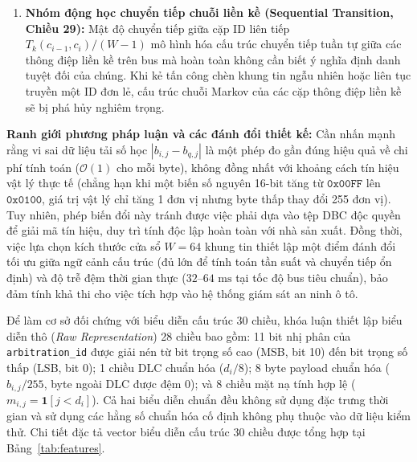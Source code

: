 \documentclass[12pt, a4paper, reqno, oneside]{book}
\DeclareRobustCommand{\code}[1]{\nolinkurl{#1}}
\begin{document}
\begin{enumerate}
    \item \textbf{Nhóm động học chuyển tiếp chuỗi liền kề (Sequential Transition, Chiều 29):} Mật độ chuyển tiếp giữa cặp ID liên tiếp $T_k(c_{i-1}, c_i) / (W - 1)$ mô hình hóa cấu trúc chuyển tiếp tuần tự giữa các thông điệp liền kề trên bus mà hoàn toàn không cần biết ý nghĩa định danh tuyệt đối của chúng. Khi kẻ tấn công chèn khung tin ngẫu nhiên hoặc liên tục truyền một ID đơn lẻ, cấu trúc chuỗi Markov của các cặp thông điệp liền kề sẽ bị phá hủy nghiêm trọng.
\end{enumerate}

\noindent\textbf{Ranh giới phương pháp luận và các đánh đổi thiết kế:}
Cần nhấn mạnh rằng vi sai dữ liệu tải số học $|b_{i,j} - b_{q,j}|$ là một phép đo gần đúng hiệu quả về chi phí tính toán ($\mathcal{O}(1)$ cho mỗi byte), không đồng nhất với khoảng cách tín hiệu vật lý thực tế (chẳng hạn khi một biến số nguyên 16-bit tăng từ $\texttt{0x00FF}$ lên $\texttt{0x0100}$, giá trị vật lý chỉ tăng 1 đơn vị nhưng byte thấp thay đổi 255 đơn vị). Tuy nhiên, phép biến đổi này tránh được việc phải dựa vào tệp DBC độc quyền để giải mã tín hiệu, duy trì tính độc lập hoàn toàn với nhà sản xuất. Đồng thời, việc lựa chọn kích thước cửa sổ $W=64$ khung tin thiết lập một điểm đánh đổi tối ưu giữa ngữ cảnh cấu trúc (đủ lớn để tính toán tần suất và chuyển tiếp ổn định) và độ trễ đệm thời gian thực ($32\text{--}64\text{ ms}$ tại tốc độ bus tiêu chuẩn), bảo đảm tính khả thi cho việc tích hợp vào hệ thống giám sát an ninh ô tô.

Để làm cơ sở đối chứng với biểu diễn cấu trúc 30 chiều, khóa luận thiết lập biểu diễn thô (\textit{Raw Representation}) 28 chiều bao gồm: 11 bit nhị phân của \code{arbitration_id} được giải nén từ bit trọng số cao (MSB, bit 10) đến bit trọng số thấp (LSB, bit 0); 1 chiều DLC chuẩn hóa ($d_i/8$); 8 byte payload chuẩn hóa ($b_{i,j}/255$, byte ngoài DLC được đệm 0); và 8 chiều mặt nạ tính hợp lệ ($m_{i,j}=\mathbf{1}[j<d_i]$). Cả hai biểu diễn chuẩn đều không sử dụng đặc trưng thời gian và sử dụng các hằng số chuẩn hóa cố định không phụ thuộc vào dữ liệu kiểm thử. Chi tiết đặc tả vector biểu diễn cấu trúc 30 chiều được tổng hợp tại Bảng~\ref{tab:features}.
\end{document}
